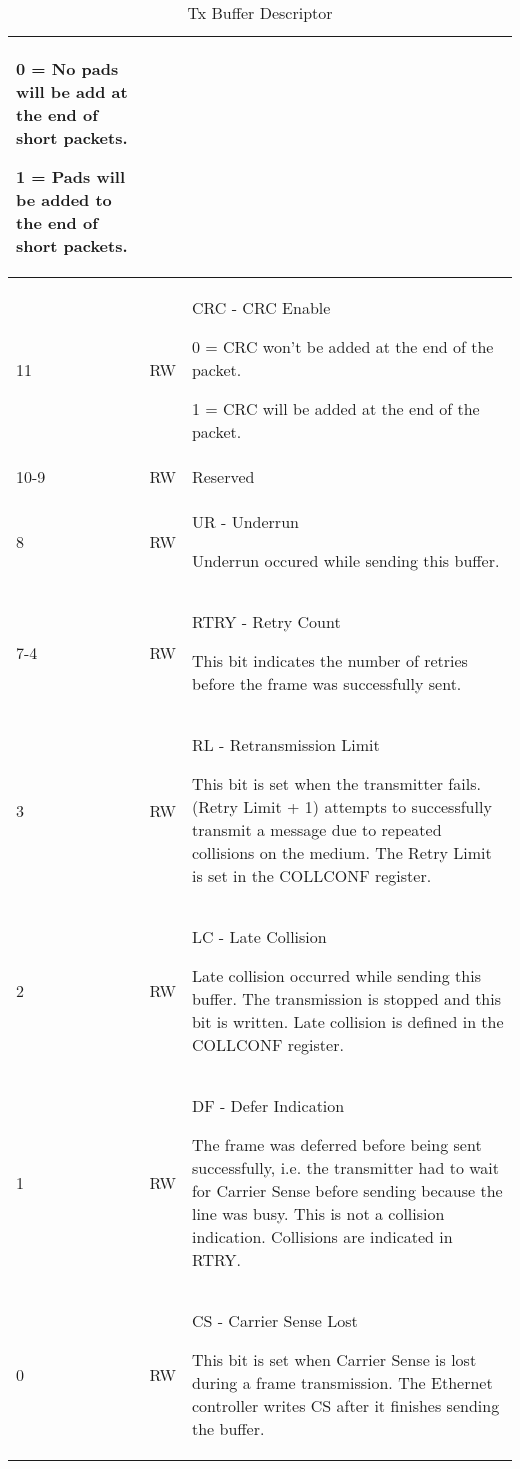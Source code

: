 \begin{table}[H]
\begin{tabularx}{\textwidth}{|l|l|X|}
                0 = No pads will be add at the end of short packets.

                1 = Pads will be added to the end of short packets.\\ \hline
    11      & RW & CRC - CRC Enable

                0 = CRC won't be added at the end of the packet.

                1 = CRC will be added at the end of the packet.\\ \hline
    \rowcolor{iob-blue}
    10-9    & RW & Reserved \\ \hline
    8       & RW & UR - Underrun

                Underrun occured while sending this buffer.\\ \hline
    \rowcolor{iob-blue}
    7-4     & RW & RTRY - Retry Count

                This bit indicates the number of retries before the frame was
                successfully sent.\\ \hline
    3       & RW & RL - Retransmission Limit

                This bit is set when the transmitter fails. (Retry Limit + 1)
                attempts to successfully transmit a message due to repeated
                collisions on the medium. The Retry Limit is set in the
                COLLCONF register.\\ \hline
    \rowcolor{iob-blue}
    2       & RW & LC - Late Collision

                Late collision occurred while sending this buffer. The
                transmission is stopped and this bit is written. Late collision
                is defined in the COLLCONF register.\\ \hline
    1       & RW & DF - Defer Indication

                The frame was deferred before being sent successfully, i.e. the
                transmitter had to wait for Carrier Sense before sending
                because the line was busy. This is not a collision indication.
                Collisions are indicated in RTRY.\\ \hline
    \rowcolor{iob-blue}
    0       & RW & CS - Carrier Sense Lost

                This bit is set when Carrier Sense is lost during a frame
                transmission. The Ethernet controller writes CS after it
                finishes sending the buffer.\\ \hline
  \end{tabularx}
    \caption{Tx Buffer Descriptor}
  \label{buffer_descriptors:tx}
\end{table}



